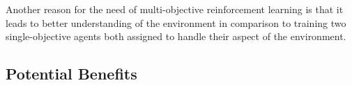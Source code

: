 Another reason for the need of multi-objective reinforcement learning is that it leads to better understanding of the environment in comparison to training two single-objective agents both assigned to handle their aspect of the environment. %


\subsection{Potential Benefits}